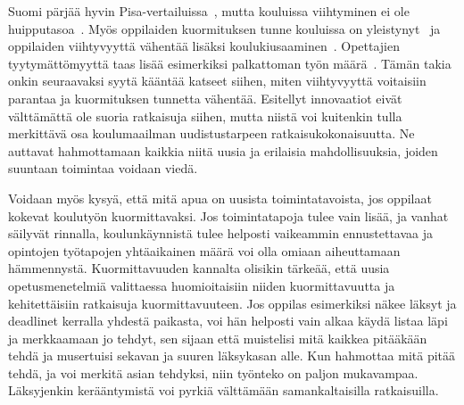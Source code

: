 \documentclass[utf8,bachelor]{gradu3}
\begin{document}

Suomi pärjää hyvin Pisa-vertailuissa~\parencite[][]{koulutHuippua}, mutta kouluissa viihtyminen ei ole huipputasoa~\parencite[][]{kouluViihtyvyys}. Myös oppilaiden kuormituksen tunne kouluissa on yleistynyt~\parencite [][]{oppilaidenKuormitus} ja oppilaiden viihtyvyyttä vähentää lisäksi koulukiusaaminen~\parencite[][]{vakivalta}. Opettajien tyytymättömyyttä taas lisää esimerkiksi palkattoman työn määrä~\parencite[][]{palkatonTyo}. Tämän takia onkin seuraavaksi syytä kääntää katseet siihen, miten viihtyvyyttä voitaisiin parantaa ja kuormituksen tunnetta vähentää. Esitellyt innovaatiot eivät välttämättä ole suoria ratkaisuja siihen, mutta niistä voi kuitenkin tulla merkittävä osa koulumaailman uudistustarpeen ratkaisukokonaisuutta. Ne auttavat hahmottamaan kaikkia niitä uusia ja erilaisia mahdollisuuksia, joiden suuntaan toimintaa voidaan viedä. 

Voidaan myös kysyä, että mitä apua on uusista toimintatavoista, jos oppilaat kokevat koulutyön kuormittavaksi. Jos toimintatapoja tulee vain lisää, ja vanhat säilyvät rinnalla, koulunkäynnistä tulee helposti vaikeammin ennustettavaa ja opintojen työtapojen yhtäaikainen määrä voi olla omiaan aiheuttamaan hämmennystä. Kuormittavuuden kannalta olisikin tärkeää, että uusia opetusmenetelmiä valittaessa huomioitaisiin niiden kuormittavuutta ja kehitettäisiin ratkaisuja kuormittavuuteen. Jos oppilas esimerkiksi näkee läksyt ja deadlinet kerralla yhdestä paikasta, voi hän helposti vain alkaa käydä listaa läpi ja merkkaamaan jo tehdyt, sen sijaan että muistelisi mitä kaikkea pitääkään tehdä ja musertuisi sekavan ja suuren läksykasan alle. Kun hahmottaa mitä pitää tehdä, ja voi merkitä asian tehdyksi, niin työnteko on paljon mukavampaa. Läksyjenkin kerääntymistä voi pyrkiä välttämään samankaltaisilla ratkaisuilla. 


\end{document}
